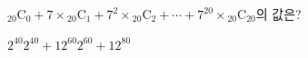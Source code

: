 ${}_{20}\mathrm{C}_0+7\times{}_{20}\mathrm{C}_1+7^2\times{}_{20}\mathrm{C}_2+\cdots+7^{20}\times{}_{20}\mathrm{C}_{20}$의 값은?
\begin{choices32}{$2^{40}$}{$2^{40}+1$}{$2^{60}$}{$2^{60}+1$}{$2^{80}$}\end{choices32}
